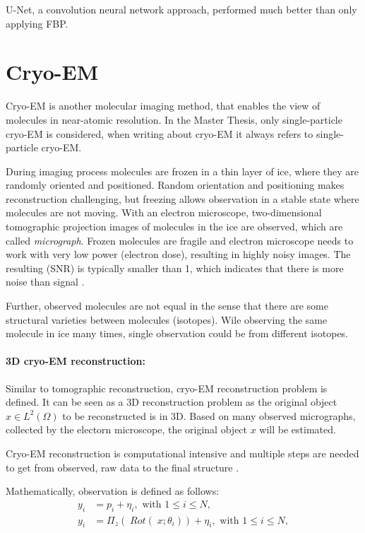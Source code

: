 U-Net\cite{unet-tomography}, a convolution neural network approach, performed
much better than only applying FBP.

\section{Cryo-EM}
Cryo-EM is another molecular imaging method, that enables the view of molecules in near-atomic resolution.
In the Master Thesis, only single-particle cryo-EM \cite{singleParticleCryoEm} is considered, 
when writing about cryo-EM it always refers to single-particle cryo-EM.

During imaging process molecules are frozen in a thin layer of ice, where they are randomly oriented and positioned. 
Random orientation and positioning makes reconstruction challenging, 
but freezing allows observation in a stable state where molecules are not moving.
With an electron microscope, two-dimensional tomographic projection images of molecules in the ice are observed,
which are called \textit{micrograph}. 
Frozen molecules are fragile and electron microscope needs to work with
very low power (electron dose), resulting in highly noisy images. The resulting (SNR)
is typically smaller than 1, which indicates that there is more noise than signal \cite{cryoEmMath2}.

Further, observed molecules are not equal in the sense that there are some structural varieties between
molecules (isotopes). Wile observing the same molecule in ice many times, single observation could be from different isotopes.

\paragraph{3D cryo-EM reconstruction:}
Similar to tomographic reconstruction, cryo-EM reconstruction problem \cite{cryoEmMath} is defined.
It can be seen as a 3D reconstruction problem as the original object $x \in L^2(\Omega)$ to be reconstructed is in 3D.
Based on many observed micrographs, collected by the electorn microscope, the original object $x$ will be estimated.

Cryo-EM reconstruction is computational intensive and multiple steps are needed to get from observed, raw data to the final structure \cite{singleParticleCryoEm}.

Mathematically, observation is defined as follows:
\begin{equation}
    \label{eq:cryoEmSimple}
    \begin{aligned}
        y_i &= p_i + \eta_i, \text{ with } 1 \leq i \leq N,\\
        y_i &= \Pi_z  (\; Rot (\;x; \theta_i )) + \eta_i, \text{ with } 1 \leq i \leq N,    
    \end{aligned}
\end{equation}

